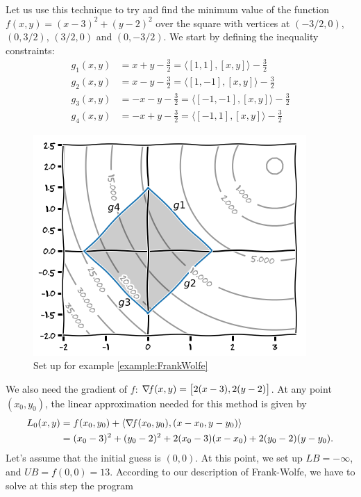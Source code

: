 \begin{example}\label{example:FrankWolfe}
Let us use this technique to try and find the minimum value of the function $f(x,y)=(x-3)^2+(y-2)^2$ over the square with vertices at $(-3/2, 0)$, $(0, 3/2)$, $(3/2, 0)$ and $(0, -3/2)$. We start by defining the inequality constraints:
\begin{align*}
g_1(x,y) &= x+y-\tfrac{3}{2} = \langle [1,1], [x,y] \rangle - \tfrac{3}{2} \\
g_2(x,y) &= x-y-\tfrac{3}{2} = \langle [1,-1], [x,y] \rangle - \tfrac{3}{2} \\
g_3(x,y) &= -x-y-\tfrac{3}{2} = \langle [-1,-1], [x,y] \rangle - \tfrac{3}{2} \\
g_4(x,y) &= -x+y-\tfrac{3}{2} = \langle [-1,1], [x,y] \rangle - \tfrac{3}{2}
\end{align*}
\begin{figure}[ht!]
\includegraphics[width=0.75\linewidth]{images/frankwolfesetup.png}
\caption{Set up for example \ref{example:FrankWolfe}}\label{figure:FrankWolfesetup}
\end{figure}
We also need the gradient of $f$: $\mathop{\nabla\! {f}}(x,y) = \big[ 2(x-3), 2(y-2) \big]$. At any point $(x_0,y_0)$, the linear approximation needed for this method is given by
\begin{align*}
L_0(x,y) &= f(x_0,y_0) + \langle \mathop{\nabla\! {f}}(x_0, y_0), (x-x_0,y-y_0) \rangle \\
&= (x_0-3)^2 + (y_0-2)^2 + 2(x_0-3)(x-x_0) + 2(y_0-2)(y-y_0).
\end{align*}
Let's assume that the initial guess is $(0,0)$.  At this point, we set up $LB=-\infty$, and $UB=f(0,0)=13$.  According to our description of Frank-Wolfe, we have to solve at this step the program
\begin{equation*}

\end{equation*}
\end{example}
